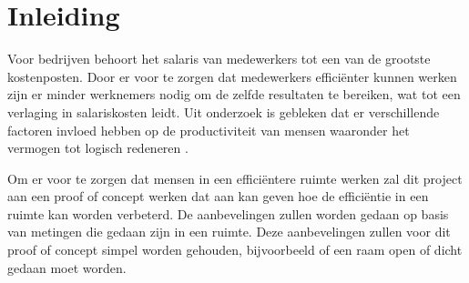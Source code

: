 \section{Inleiding} \label{sec:introduction}
Voor bedrijven behoort het salaris van medewerkers tot een van de grootste kostenposten. Door er voor te zorgen dat medewerkers efficiënter kunnen werken zijn er minder werknemers nodig om de zelfde resultaten te bereiken, wat tot een verlaging in salariskosten leidt. Uit onderzoek is gebleken dat er verschillende factoren invloed hebben op de productiviteit van mensen waaronder het vermogen tot logisch redeneren \cite{wyon2006room}.

Om er voor te zorgen dat mensen in een efficiëntere ruimte werken zal dit project aan een proof of concept werken dat aan kan geven hoe de efficiëntie in een ruimte kan worden verbeterd. De aanbevelingen zullen worden gedaan op basis van metingen die gedaan zijn in een ruimte. Deze aanbevelingen zullen voor dit proof of concept simpel worden gehouden, bijvoorbeeld of een raam open of dicht gedaan moet worden.
